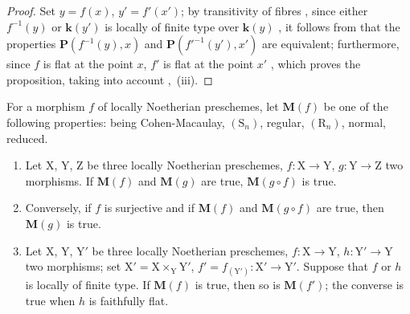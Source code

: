 \begin{proof}
Set $y=f(x)$, $y'=f'(x')$; by transitivity of fibres , since either $f^{-1}(y)$ or $\boldsymbol{k}(y')$ is locally of finite type over $\boldsymbol{k}(y)$ , it follows from  that the properties $\boldsymbol{P}(f^{-1}(y),x)$ and $\boldsymbol{P}(f'^{-1}(y'),x')$ are equivalent; furthermore, since $f$ is flat at the point $x$, $f'$ is flat at the point $x'$ , which proves the proposition, taking into account ,~(iii).
\end{proof}

\begin{proposition}[6.8.3]
\label{IV.6.8.3}
For a morphism $f$ of locally Noetherian preschemes, let $\boldsymbol{M}(f)$ be one of the following properties: being Cohen-Macaulay, $(\mathrm{S}_n)$, regular, $(\mathrm{R}_n)$, normal, reduced.
\begin{enumerate}[label=(\roman*)]
  \item Let $\mathrm{X}$, $\mathrm{Y}$, $\mathrm{Z}$ be three locally Noetherian preschemes, $f:\mathrm{X}\to\mathrm{Y}$, $g:\mathrm{Y}\to\mathrm{Z}$ two morphisms. If $\boldsymbol{M}(f)$ and $\boldsymbol{M}(g)$ are true, $\boldsymbol{M}(g\circ f)$ is true.
  \item Conversely, if $f$ is surjective and if $\boldsymbol{M}(f)$ and $\boldsymbol{M}(g\circ f)$ are true, then $\boldsymbol{M}(g)$ is true.
  \item Let $\mathrm{X}$, $\mathrm{Y}$, $\mathrm{Y}'$ be three locally Noetherian preschemes, $f:\mathrm{X}\to\mathrm{Y}$, $h:\mathrm{Y}'\to\mathrm{Y}$ two morphisms; set $\mathrm{X}'=\mathrm{X}\times_\mathrm{Y}\mathrm{Y}'$, $f'=f_{(\mathrm{Y}')}:\mathrm{X}'\to\mathrm{Y}'$. Suppose that $f$ or $h$ is locally of finite type. If $\boldsymbol{M}(f)$ is true, then so is $\boldsymbol{M}(f')$; the converse is true when $h$ is faithfully flat.
\end{enumerate}
\end{proposition}

